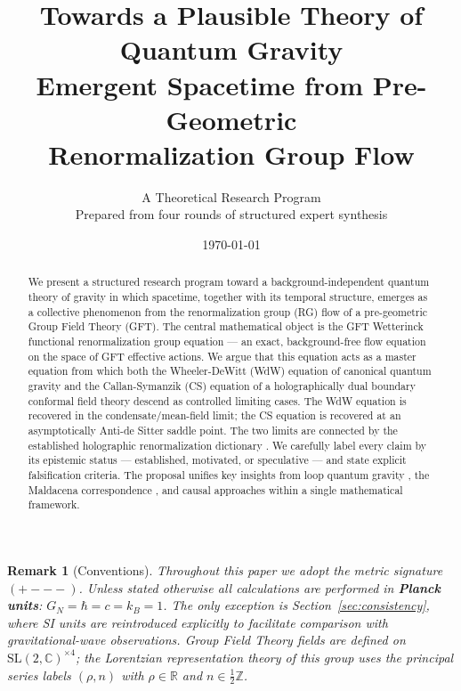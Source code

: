 \documentclass[12pt,a4paper]{article}
\newtheorem{remark}{Remark}
\begin{document}
\title{\textbf{Towards a Plausible Theory of Quantum Gravity}\\[6pt]
\large Emergent Spacetime from Pre-Geometric\\
Renormalization Group Flow}

\author{
A Theoretical Research Program\\[4pt]
\small{Prepared from four rounds of structured expert synthesis}
}
\date{\today}
\maketitle
\tableofcontents
\newpage

\begin{remark}[Conventions]
Throughout this paper we adopt the metric signature $({+}{-}{-}{-})$.
Unless stated otherwise all calculations are performed in
\textbf{Planck units}: $G_N = \hbar = c = k_B = 1$.
The only exception is Section~\ref{sec:consistency}, where SI units
are reintroduced explicitly to facilitate comparison with
gravitational-wave observations.
Group Field Theory fields are defined on
$\mathrm{SL}(2,\mathbb{C})^{\times 4}$; the Lorentzian representation
theory of this group uses the principal series labels $(\rho,n)$
with $\rho\in\mathbb{R}$ and $n\in\tfrac{1}{2}\mathbb{Z}$.
\end{remark}

\begin{abstract}
We present a structured research program toward a background-independent
quantum theory of gravity in which spacetime, together with its temporal
structure, emerges as a collective phenomenon from the renormalization
group (RG) flow of a pre-geometric Group Field Theory (GFT).
The central mathematical object is the GFT Wetterinck functional
renormalization group equation — an exact, background-free flow equation
on the space of GFT effective actions.
We argue that this equation acts as a master equation from which both
the Wheeler-DeWitt (WdW) equation of canonical quantum gravity and the
Callan-Symanzik (CS) equation of a holographically dual boundary
conformal field theory descend as controlled limiting cases.
The WdW equation is recovered in the condensate/mean-field limit; the CS
equation is recovered at an asymptotically Anti-de Sitter saddle point.
The two limits are connected by the established holographic
renormalization dictionary \cite{skenderis2002,witten1998}.
We carefully label every claim by its epistemic status — established,
motivated, or speculative — and state explicit falsification criteria.
The proposal unifies key insights from loop quantum gravity \cite{ashtekar2004,thiemann1996},
the Maldacena correspondence \cite{maldacena1997}, and causal approaches
\cite{henson2006} within a single mathematical framework.
\end{abstract}
\end{document}
